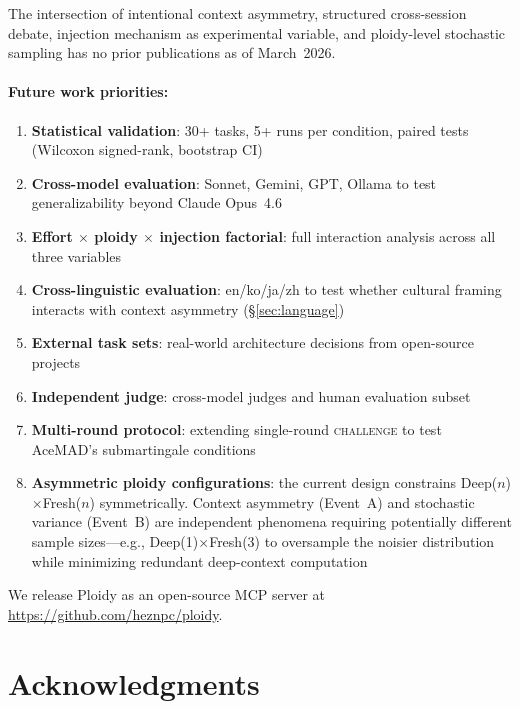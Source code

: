 \documentclass[11pt]{article}
\begin{document}
The intersection of intentional context asymmetry, structured cross-session debate, injection mechanism as experimental variable, and ploidy-level stochastic sampling has no prior publications as of March~2026.

\paragraph{Future work priorities:}
\begin{enumerate}[label=\arabic*., leftmargin=1.5em]
  \item \textbf{Statistical validation}: 30+ tasks, 5+ runs per condition, paired tests (Wilcoxon signed-rank, bootstrap CI)
  \item \textbf{Cross-model evaluation}: Sonnet, Gemini, GPT, Ollama to test generalizability beyond Claude Opus~4.6
  \item \textbf{Effort $\times$ ploidy $\times$ injection factorial}: full interaction analysis across all three variables
  \item \textbf{Cross-linguistic evaluation}: en/ko/ja/zh to test whether cultural framing interacts with context asymmetry (\S\ref{sec:language})
  \item \textbf{External task sets}: real-world architecture decisions from open-source projects
  \item \textbf{Independent judge}: cross-model judges and human evaluation subset
  \item \textbf{Multi-round protocol}: extending single-round \textsc{challenge} to test AceMAD's submartingale conditions
  \item \textbf{Asymmetric ploidy configurations}: the current design constrains Deep($n$)$\times$Fresh($n$) symmetrically. Context asymmetry (Event~A) and stochastic variance (Event~B) are independent phenomena requiring potentially different sample sizes---e.g., Deep(1)$\times$Fresh(3) to oversample the noisier distribution while minimizing redundant deep-context computation
\end{enumerate}

We release Ploidy as an open-source MCP server at \url{https://github.com/heznpc/ploidy}.

\section*{Acknowledgments}
\end{document}
